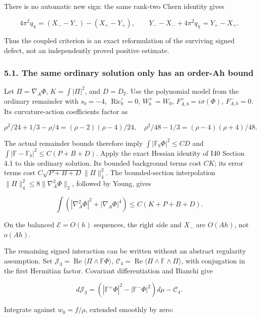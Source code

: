 \documentclass[
  10pt,
]{article}
\begin{document}
There is no automatic new sign: the same rank-two Chern identity gives

\[
 4\pi^2q_\chi=(X_--Y_-)-(X_+-Y_+),\qquad
 Y_--X_-+4\pi^2q_\chi=Y_+-X_+.
 \tag{5.4}
\]

Thus the coupled criterion is an exact reformulation of the surviving
signed defect, not an independently proved positive estimate.

\hypertarget{the-same-ordinary-solution-only-has-an-order-ah-bound}{%
\subsubsection{5.1. The same ordinary solution only has an order-Ah
bound}\label{the-same-ordinary-solution-only-has-an-order-ah-bound}}

Let \(\Pi=\nabla_A\Phi\), \(K=\int|\Pi|^2\), and \(D=D_2\). Use the
polynomial model from the ordinary remainder with \(s_b=-4\),
\(\operatorname{Ric}_b^\circ=0\), \(W_b^+=W_0\),
\(F_{A,b}^+=i\sigma(\Phi)\), \(F_{A,b}^-=0\). Its curvature-action
coefficients factor as

\[
 \rho^2/24+1/3-\rho/4=(\rho-2)(\rho-4)/24,
 \quad \rho^2/48-1/3=(\rho-4)(\rho+4)/48.
\]

The actual remainder bounds therefore imply
\(\int|\mathbb F_b\Phi|^2\le CD\) and
\(\int|\mathbb F-\mathbb F_b|^2\le C(P+B+D)\). Apply the exact Hessian
identity of I40 Section 4.1 to this ordinary solution. Its bounded
background terms cost \(CK\); its error terms cost
\(C\sqrt{P+B+D}\|\Pi\|_4^2\). The bounded-section interpolation
\(\|\Pi\|_4^2\le8\|\nabla_A^2\Phi\|_2\), followed by Young, gives

\[
 \int(|\nabla_A^2\Phi|^2+|\nabla_A\Phi|^4)
                  \le C(K+P+B+D).
 \tag{5.5}
\]

On the balanced \(\mathcal E=O(h)\) sequences, the right side and
\(X_-\) are \(O(Ah)\), not \(o(Ah)\).

The remaining signed interaction can be written without an abstract
regularity assumption. Set
\(\mathcal J_3=\operatorname{Re}\langle\Pi\wedge\mathbb F\Phi\rangle\),
\(\mathcal C_4=\operatorname{Re}\langle\Pi\wedge\mathbb F\wedge\Pi\rangle\),
with conjugation in the first Hermitian factor. Covariant
differentiation and Bianchi give

\[
 d\mathcal J_3=(|\mathbb F^+\Phi|^2-|\mathbb F^-\Phi|^2)d\mu
                          -\mathcal C_4.
\]

Integrate against \(w_0=f/\rho\), extended smoothly by zero:
\end{document}
